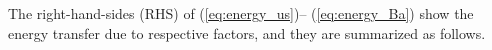 The right-hand-sides (RHS) of (\ref{eq:energy_us})-- (\ref{eq:energy_Ba}) show the energy transfer due to respective factors, and they are summarized as follows.
